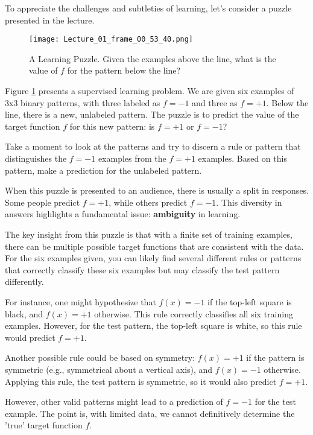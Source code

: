 \documentclass{article}
\begin{document}
To appreciate the challenges and subtleties of learning, let's consider a puzzle presented in the lecture.

\begin{figure}[H]
    \centering
    \texttt{[image: Lecture\_01\_frame\_00\_53\_40.png]}
    \caption{A Learning Puzzle. Given the examples above the line, what is the value of \(f\) for the pattern below the line?}
    \label{fig:learning_puzzle}
\end{figure}

Figure \ref{fig:learning_puzzle} presents a supervised learning problem. We are given six examples of 3x3 binary patterns, with three labeled as \(f = -1\) and three as \(f = +1\).  Below the line, there is a new, unlabeled pattern. The puzzle is to predict the value of the target function \(f\) for this new pattern: is \(f = +1\) or \(f = -1\)?

Take a moment to look at the patterns and try to discern a rule or pattern that distinguishes the \(f = -1\) examples from the \(f = +1\) examples.  Based on this pattern, make a prediction for the unlabeled pattern.

When this puzzle is presented to an audience, there is usually a split in responses. Some people predict \(f = +1\), while others predict \(f = -1\).  This diversity in answers highlights a fundamental issue: \textbf{ambiguity} in learning.

The key insight from this puzzle is that with a finite set of training examples, there can be multiple possible target functions that are consistent with the data.  For the six examples given, you can likely find several different rules or patterns that correctly classify these six examples but may classify the test pattern differently.

For instance, one might hypothesize that \(f(x) = -1\) if the top-left square is black, and \(f(x) = +1\) otherwise.  This rule correctly classifies all six training examples.  However, for the test pattern, the top-left square is white, so this rule would predict \(f = +1\).

Another possible rule could be based on symmetry: \(f(x) = +1\) if the pattern is symmetric (e.g., symmetrical about a vertical axis), and \(f(x) = -1\) otherwise.  Applying this rule, the test pattern is symmetric, so it would also predict \(f = +1\).

However, other valid patterns might lead to a prediction of \(f = -1\) for the test example.  The point is, with limited data, we cannot definitively determine the 'true' target function \(f\).
\end{document}
